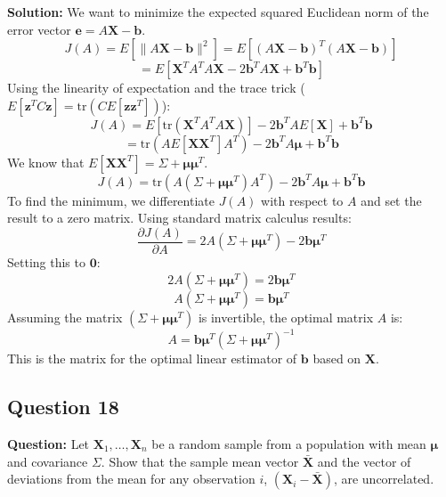 \textbf{Solution:}
We want to minimize the expected squared Euclidean norm of the error vector $\mathbf{e} = A\mathbf{X} - \mathbf{b}$.
$$ J(A) = E[\|A\mathbf{X} - \mathbf{b}\|^2] = E[(A\mathbf{X} - \mathbf{b})^T(A\mathbf{X} - \mathbf{b})] $$
$$ = E[\mathbf{X}^T A^T A \mathbf{X} - 2\mathbf{b}^T A \mathbf{X} + \mathbf{b}^T\mathbf{b}] $$
Using the linearity of expectation and the trace trick ($E[\mathbf{z}^T C \mathbf{z}] = \text{tr}(C E[\mathbf{z}\mathbf{z}^T])$):
$$ J(A) = E[\text{tr}(\mathbf{X}^T A^T A \mathbf{X})] - 2\mathbf{b}^T A E[\mathbf{X}] + \mathbf{b}^T\mathbf{b} $$
$$ = \text{tr}(A E[\mathbf{X}\mathbf{X}^T] A^T) - 2\mathbf{b}^T A \boldsymbol{\mu} + \mathbf{b}^T\mathbf{b} $$
We know that $E[\mathbf{X}\mathbf{X}^T] = \Sigma + \boldsymbol{\mu}\boldsymbol{\mu}^T$.
$$ J(A) = \text{tr}(A(\Sigma + \boldsymbol{\mu}\boldsymbol{\mu}^T)A^T) - 2\mathbf{b}^T A \boldsymbol{\mu} + \mathbf{b}^T\mathbf{b} $$
To find the minimum, we differentiate $J(A)$ with respect to $A$ and set the result to a zero matrix. Using standard matrix calculus results:
$$ \frac{\partial J(A)}{\partial A} = 2A(\Sigma + \boldsymbol{\mu}\boldsymbol{\mu}^T) - 2\mathbf{b}\boldsymbol{\mu}^T $$
Setting this to $\mathbf{0}$:
$$ 2A(\Sigma + \boldsymbol{\mu}\boldsymbol{\mu}^T) = 2\mathbf{b}\boldsymbol{\mu}^T $$
$$ A(\Sigma + \boldsymbol{\mu}\boldsymbol{\mu}^T) = \mathbf{b}\boldsymbol{\mu}^T $$
Assuming the matrix $(\Sigma + \boldsymbol{\mu}\boldsymbol{\mu}^T)$ is invertible, the optimal matrix $A$ is:
$$ A = \mathbf{b}\boldsymbol{\mu}^T (\Sigma + \boldsymbol{\mu}\boldsymbol{\mu}^T)^{-1} $$
This is the matrix for the optimal linear estimator of $\mathbf{b}$ based on $\mathbf{X}$.

\subsection*{Question 18}
\textbf{Question:} Let $\mathbf{X}_1, \dots, \mathbf{X}_n$ be a random sample from a population with mean $\boldsymbol{\mu}$ and covariance $\Sigma$. Show that the sample mean vector $\bar{\mathbf{X}}$ and the vector of deviations from the mean for any observation $i$, $(\mathbf{X}_i - \bar{\mathbf{X}})$, are uncorrelated.


